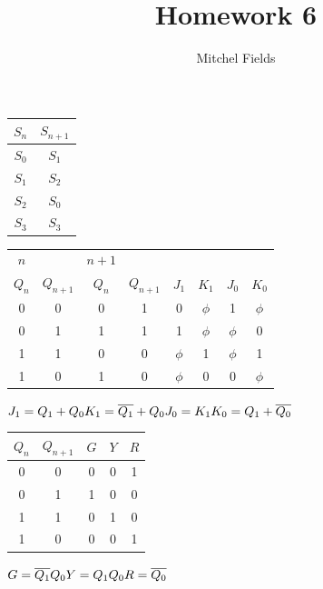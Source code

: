 \documentclass{article}
\title{Homework 6}
\author{Mitchel Fields}
\begin{document}
\maketitle

\begin{tabular}{c | c}
$S_n$ & $S_{n+1}$\\ \hline
$S_0$ & $S_{1}$\\
$S_1$ & $S_{2}$\\
$S_2$ & $S_{0}$\\
$S_3$ & $S_{3}$
\end{tabular}

\begin{tabular}{c c | c c | c c | c c}
$n$ & & $n+1$ \\
$Q_n$ & $Q_{n+1}$ & $Q_n$ & $Q_{n+1}$ & $J_1$ & $K_1$ & $J_0$ & $K_0$ \\ \hline
0 & 0 & 0 & 1 & 0 & $\phi$ & 1 & $\phi$ \\
0 & 1 & 1 & 1 & 1 & $\phi$ & $\phi$ & 0 \\
1 & 1 & 0 & 0 & $\phi$ & 1 & $\phi$ & 1 \\
1 & 0 & 1 & 0 & $\phi$ & 0 & 0 & $\phi$
\end{tabular}

\noindent $J_1 = Q_1 + Q_0\\
K_1 = \overline{Q_1} + Q_0\\
J_0 = K_1\\
K_0 = Q_1 + \overline{Q_0}$

\begin{tabular}{c c | c c c}
$Q_n$ & $Q_{n+1}$ & $G$ & $Y$ & $R$ \\ \hline
0 & 0 & 0 & 0 & 1 \\
0 & 1 & 1 & 0 & 0 \\
1 & 1 & 0 & 1 & 0 \\
1 & 0 & 0 & 0 & 1
\end{tabular}

\noindent $G = \overline{Q_1}Q_0\\
Y = Q_1Q_0\\
R = \overline{Q_0}$\\
\end{document}
